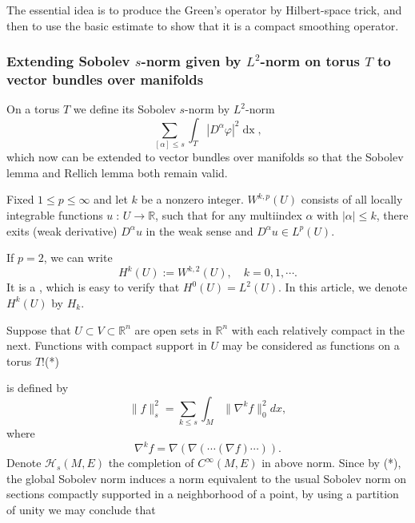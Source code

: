 \documentclass[twoside,openany,12pt]{beautynote}
\newcommand{\assign}{:=}
\newcommand{\tmop}[1]{\ensuremath{\operatorname{#1}}}
\begin{document}
The essential idea is to produce the Green's operator by
Hilbert-space trick, and then to use the basic
estimate to show that it is a compact smoothing
operator.


\subsubsection{Extending Sobolev $s$-norm given by $L^2$-norm on torus $T$ to
vector bundles over manifolds}

On a torus $T$ we define its Sobolev $s$-norm by $L^2$-norm
\[  \sum_{[\alpha] \leqslant s} \int_T | D^{\alpha} \varphi |^2 \tmop{dx}, \]
which now can be extended to vector bundles over manifolds so that the Sobolev
lemma and Rellich lemma both remain valid.

\begin{definition}\label{def:Sobolevspace}
  Fixed $1 \leqslant p \leqslant \infty$ and let $k$ be a nonzero integer.
  $W^{k, p} (U)$ consists of all locally integrable functions $u \; : \, U
  \longrightarrow \mathbb{R}$, such that for any multiindex $\alpha$ with $|
  \alpha | \leqslant k$, there exits (weak derivative) $D^{\alpha} u$ in the
  weak sense and $D^{\alpha} u \in L^p  (U)$.
\end{definition}

\begin{remark}
  If $p = 2$, we can write
  \[ H^k  (U) \assign W^{k, 2} (U), \quad k = 0, 1, \cdots . \]
  It is a {}, which is easy to verify that
  $H^0  (U) = L^2  (U)$. In this article, we denote $H^k (U)$ by $H_k$.
\end{remark}

{\color[HTML]{B4005A}Suppose
that $U \subset V \subset \mathbb{R}^n$ are open sets in $\mathbb{R}^n$ with
each relatively compact in the next. Functions with compact support in $U$ may
be considered as functions on a torus $T$!}\quad (*)

{\color[HTML]{B4005A}} is defined by
\[ \|f\|_s^2 = \sum_{k \leqslant s} \int_M \| \text{} \nabla^k f\|_0^2 d x,
\]
where
\[ \nabla^k f = \nabla (\nabla (\cdots (\nabla f) \cdots)) . \]
Denote $\mathcal{H}_s (M, E)$ the completion of $C^{\infty} (M, E)$ in above
norm. Since by (*), the global Sobolev norm induces a norm equivalent to the
usual Sobolev norm on sections compactly supported in a neighborhood of a
point, by using a partition of unity we may conclude that
\end{document}
